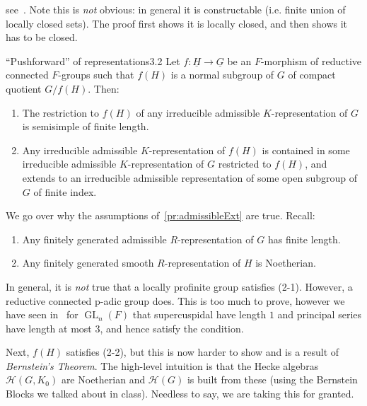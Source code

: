\documentclass{article}
\newcommand{\GL}{{\operatorname{GL}}}
\begin{document}
\begin{Proof}
  see~\cite{henniartRepresentationsSL2F2025}. Note this is \emph{not} obvious: in general it is constructable
  (i.e. finite union of locally closed sets). The proof first shows it is locally closed, and then shows it
  has to be closed.
\end{Proof}


\begin{thm}{``Pushforward'' of representations}{3.2}
  Let \(f: \underline{H} \to \underline{G}\) be an \(F\)-morphism of reductive connected \(F\)-groups such
  that \(f(H)\) is a normal subgroup of \(G\) of compact quotient \(G/f(H)\). Then:

  \begin{enumerate}
    \item  The restriction to \(f(H)\) of any irreducible admissible \(K\)-representation of \(G\) is semisimple of finite length.
    \item Any irreducible admissible \(K\)-representation of \(f(H)\) is contained in some irreducible
      admissible \(K\)-representation of \(G\) restricted to \(f(H)\), and extends to an irreducible
      admissible representation of some open subgroup of \(G\) of finite index.
  \end{enumerate}
\end{thm}

\begin{Proof}
  We go over why the assumptions of~\cref{pr:admissibleExt} are true. Recall:
  \begin{enumerate}[label=(2-\arabic*)]
      \item Any finitely generated admissible $R$-representation of $G$ has finite length.
      \item Any finitely generated smooth $R$-representation of $H$ is Noetherian.
  \end{enumerate}
  In general, it is \emph{not} true that a locally profinite group satisfies (2-1). However, a reductive
  connected p-adic group does. This is too much to prove, however we have seen in~\cite{NatePadicRep} for
  $\GL_n(F)$ that supercuspidal have length $1$ and principal series have length at most $3$, and hence
  satisfy the condition.

  Next, $f(H)$ satisfies (2-2), but this is now harder to show and is a result of \emph{Bernstein's Theorem}.
  The high-level intuition is that the Hecke algebras $\mathcal{H}(G, K_0)$ are Noetherian and $\mathcal{H}(G)$ is built from
  these (using the Bernstein Blocks we talked about in class). Needless to say, we are taking this for
  granted.
\end{Proof}
\end{document}
